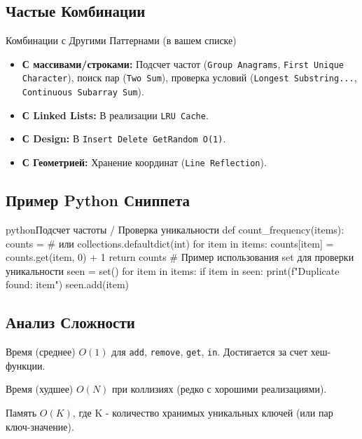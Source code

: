 \subsection{Частые Комбинации}
\begin{myblock}{Комбинации с Другими Паттернами (в вашем списке)}
    \begin{itemize}[nosep, leftmargin=*]
        \item \textbf{С массивами/строками:} Подсчет частот (\texttt{Group Anagrams}, \texttt{First Unique Character}), поиск пар (\texttt{Two Sum}), проверка условий (\texttt{Longest Substring...}, \texttt{Continuous Subarray Sum}).
        \item \textbf{С Linked Lists:} В реализации \texttt{LRU Cache}.
        \item \textbf{С Design:} В \texttt{Insert Delete GetRandom O(1)}.
        \item \textbf{С Геометрией:} Хранение координат (\texttt{Line Reflection}).
    \end{itemize}
\end{myblock}

\subsection{Пример Python Сниппета}
\begin{codebox}{python}{Подсчет частоты / Проверка уникальности}
def count_frequency(items):
    counts = {} # или collections.defaultdict(int)
    for item in items:
        counts[item] = counts.get(item, 0) + 1
    return counts
# Пример использования set для проверки уникальности
seen = set()
for item in items:
    if item in seen:
        print(f"Duplicate found: {item}")
    seen.add(item)
\end{codebox}

\subsection{Анализ Сложности}
\begin{myblock}{Время (среднее)}
    $O(1)$ для \texttt{add}, \texttt{remove}, \texttt{get}, \texttt{in}. Достигается за счет хеш-функции.
\end{myblock}
\begin{myblock}{Время (худшее)}
    $O(N)$ при коллизиях (редко с хорошими реализациями).
\end{myblock}
\begin{myblock}{Память}
    $O(K)$, где K - количество хранимых уникальных ключей (или пар ключ-значение).
\end{myblock}

